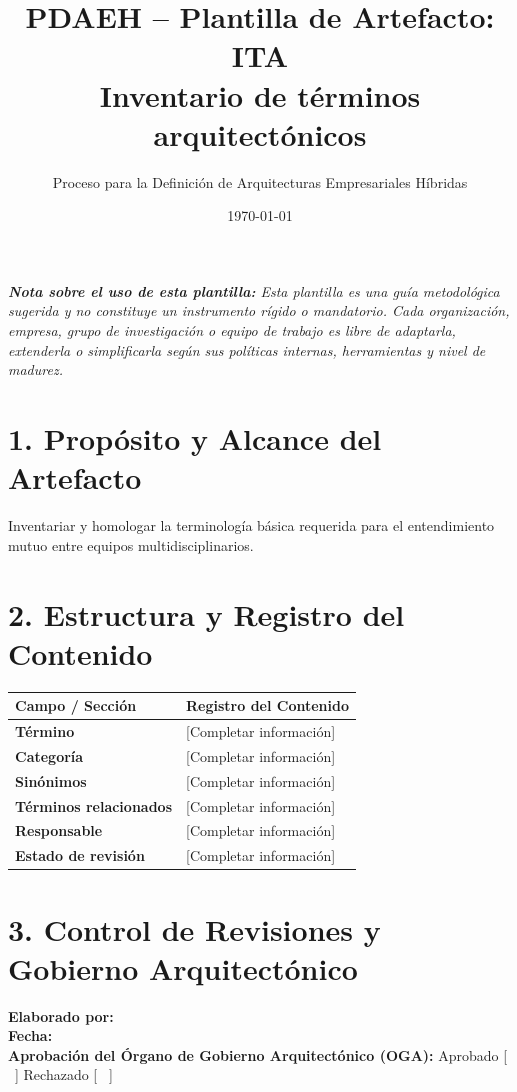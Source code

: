 \documentclass[11pt,a4paper]{article}
\title{\textbf{\color{brandgreen} PDAEH -- Plantilla de Artefacto: ITA} \\[0.3em] \large Inventario de términos arquitectónicos}
\author{Proceso para la Definición de Arquitecturas Empresariales Híbridas}
\date{\today}
\begin{document}
\maketitle

\noindent \textit{\textbf{Nota sobre el uso de esta plantilla:} Esta plantilla es una guía metodológica sugerida y no constituye un instrumento rígido o mandatorio. Cada organización, empresa, grupo de investigación o equipo de trabajo es libre de adaptarla, extenderla o simplificarla según sus políticas internas, herramientas y nivel de madurez.}

\section*{1. Propósito y Alcance del Artefacto}
Inventariar y homologar la terminología básica requerida para el entendimiento mutuo entre equipos multidisciplinarios.

\section*{2. Estructura y Registro del Contenido}
\begin{tabularx}{\textwidth}{|>{\bfseries}p{4.5cm}|X|}
    \hline
    \rowcolor[gray]{0.92} Campo / Sección & Registro del Contenido \\ \hline
    \textbf{Término} & [Completar información] \\ \hline
    \textbf{Categoría} & [Completar información] \\ \hline
    \textbf{Sinónimos} & [Completar información] \\ \hline
    \textbf{Términos relacionados} & [Completar información] \\ \hline
    \textbf{Responsable} & [Completar información] \\ \hline
    \textbf{Estado de revisión} & [Completar información] \\ \hline
\end{tabularx}

\vspace{1.2cm}
\section*{3. Control de Revisiones y Gobierno Arquitectónico}
\noindent \textbf{Elaborado por:} \hrulefill \\[0.5em]
\textbf{Fecha:} \hrulefill \\[0.5em]
\textbf{Aprobación del Órgano de Gobierno Arquitectónico (OGA):} Aprobado [ \, ] \quad Rechazado [ \, ]
\end{document}
